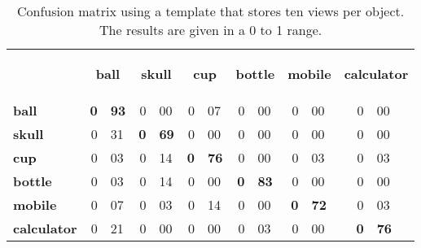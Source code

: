 
\begin{table}[H]
\centering
\begin{tabular} {l r@{.}l r@{.}l r@{.}l r@{.}l r@{.}l r@{.}l }
\toprule
\addlinespace[3mm]
   \multicolumn{1}{c}{\begin{center}\textbf{Real} \mid \textbf{Predicted}\end{center}} &
   \multicolumn{2}{c}{\begin{flushright}\textbf{ball}\end{flushright}} &
   \multicolumn{2}{c}{\begin{flushright}\textbf{skull}\end{flushright}} &
   \multicolumn{2}{c}{\begin{flushright}\textbf{cup}\end{flushright}} &
   \multicolumn{2}{c}{\begin{flushright}\textbf{bottle}\end{flushright}} &
   \multicolumn{2}{c}{\begin{flushright}\textbf{mobile}\end{flushright}} &
   \multicolumn{2}{c}{\begin{flushright}\textbf{calculator}\end{flushright}} &\\

\addlinespace[-3mm]

\midrule
\textbf{ball}		&	\textbf{0}&\textbf{93}	&	0&00	&	0&07	&	0&00	&	0&00	&	0&00	\\
\textbf{skull}		&	0&31	&	\textbf{0}&\textbf{69}	&	0&00	&	0&00	&	0&00	&	0&00	\\
\textbf{cup}		&	0&03	&	0&14	&	\textbf{0}&\textbf{76}	&	0&00	&	0&03	&	0&03	\\
\textbf{bottle}		&	0&03	&	0&14	&	0&00	&	\textbf{0}&\textbf{83}	&	0&00	&	0&00	\\
\textbf{mobile}		&	0&07	&	0&03	&	0&14	&	0&00	&	\textbf{0}&\textbf{72}	&	0&03	\\
\textbf{calculator}	&	0&21	&	0&00	&	0&00	&	0&03	&	0&00	&	\textbf{0}&\textbf{76}	\\


\bottomrule
\end{tabular}
\caption[Confusion matrix - templates using 10 views]{Confusion matrix using a template that stores ten views per object. The results are given in a 0 to 1 range. }
\label{10views_matrix}
\end{table}





